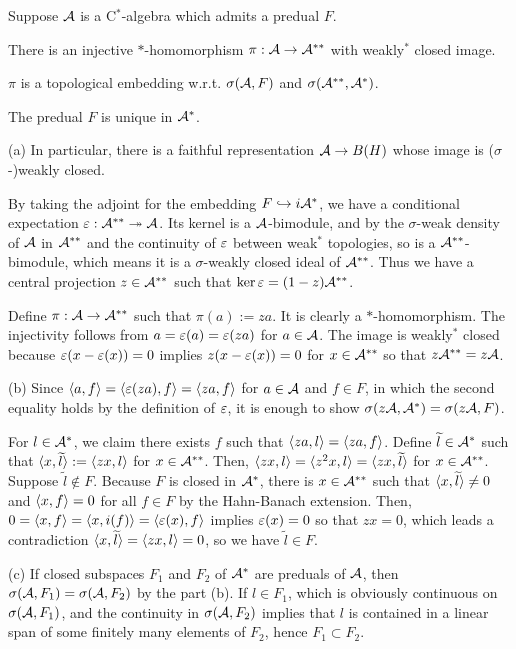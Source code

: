 \documentclass{../../small}
\begin{document}
\begin{thm}[Sakai]
Suppose $\mathcal{A}$ is a C$^*$-algebra which admits a predual $F$.
\begin{parts}
\item There is an injective $*$-homomorphism $\pi:\mathcal{A}\to\mathcal{A}^{**}$ with weakly$^*$ closed image.
\item $\pi$ is a topological embedding w.r.t. $\sigma(\mathcal{A},F)$ and $\sigma(\mathcal{A}^{**},\mathcal{A}^*)$.
\item The predual $F$ is unique in $\mathcal{A}^*$.
\end{parts}
(a)
In particular, there is a faithful representation $\mathcal{A}\to B(H)$ whose image is ($\sigma$-)weakly closed.
\end{thm}
\begin{pf}
By taking the adjoint for the embedding $F\hookrightarrow{i}\mathcal{A}^*$, we have a conditional expectation $\varepsilon:\mathcal{A}^{**}\twoheadrightarrow\mathcal{A}$.
Its kernel is a $\mathcal{A}$-bimodule, and by the $\sigma$-weak density of $\mathcal{A}$ in $\mathcal{A}^{**}$ and the continuity of $\varepsilon$ between weak$^*$ topologies, so is a $\mathcal{A}^{**}$-bimodule, which means it is a $\sigma$-weakly closed ideal of $\mathcal{A}^{**}$.
Thus we have a central projection $z\in\mathcal{A}^{**}$ such that $\ker\varepsilon=(1-z)\mathcal{A}^{**}$.

Define $\pi:\mathcal{A}\to\mathcal{A}^{**}$ such that $\pi(a):=za$.
It is clearly a $*$-homomorphism.
The injectivity follows from $a=\varepsilon(a)=\varepsilon(za)$ for $a\in\mathcal{A}$.
The image is weakly$^*$ closed because $\varepsilon(x-\varepsilon(x))=0$ implies $z(x-\varepsilon(x))=0$ for $x\in\mathcal{A}^{**}$ so that $z\mathcal{A}^{**}=z\mathcal{A}$.

(b)
Since $\langle a,f\rangle=\langle\varepsilon(za),f\rangle=\langle za,f\rangle$ for $a\in\mathcal{A}$ and $f\in F$, in which the second equality holds by the definition of $\varepsilon$, it is enough to show $\sigma(z\mathcal{A},\mathcal{A}^*)=\sigma(z\mathcal{A},F)$.

For $l\in\mathcal{A}^*$, we claim there exists $f$ such that $\langle za,l\rangle=\langle za,f\rangle$.
Define $\widetilde l\in\mathcal{A}^*$ such that $\langle x,\widetilde l\rangle:=\langle zx,l\rangle$ for $x\in\mathcal{A}^{**}$.
Then, $\langle zx,l\rangle=\langle z^2x,l\rangle=\langle zx,\widetilde l\rangle$ for $x\in\mathcal{A}^{**}$.
Suppose $\tilde l\notin F$.
Because $F$ is closed in $\mathcal{A}^*$, there is $x\in\mathcal{A}^{**}$ such that $\langle x,\widetilde l\rangle\ne0$ and $\langle x,f\rangle=0$ for all $f\in F$ by the Hahn-Banach extension.
Then, $0=\langle x,f\rangle=\langle x,i(f)\rangle=\langle\varepsilon(x),f\rangle$ implies $\varepsilon(x)=0$ so that $zx=0$, which leads a contradiction $\langle x,\widetilde l\rangle=\langle zx,l\rangle=0$, so we have $\tilde l\in F$.

(c)
If closed subspaces $F_1$ and $F_2$ of $\mathcal{A}^*$ are preduals of $\mathcal{A}$, then $\sigma(\mathcal{A},F_1)=\sigma(\mathcal{A},F_2)$ by the part (b).
If $l\in F_1$, which is obviously continuous on $\sigma(\mathcal{A},F_1)$, and the continuity in $\sigma(\mathcal{A},F_2)$ implies that $l$ is contained in a linear span of some finitely many elements of $F_2$, hence $F_1\subset F_2$.
\end{pf}
\end{document}

